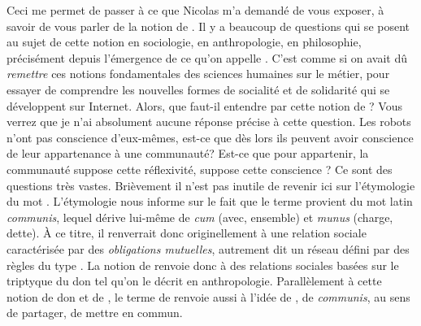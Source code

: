 {Ceci me permet de passer \`a ce que Nicolas m'a demand\'e de vous exposer, \`a savoir de vous parler de la notion de . Il y a beaucoup de questions qui se posent au sujet de cette notion en sociologie, en anthropologie, en philosophie, pr\'ecis\'ement depuis l'\'emergence de ce qu'on appelle . C'est comme si on avait d\^u {\em remettre} ces notions fondamentales des sciences humaines sur le m\'etier, pour essayer de comprendre les nouvelles formes de socialit\'e et de solidarit\'e qui se d\'eveloppent sur Internet. Alors, que faut{}-il entendre par cette notion de ? Vous verrez que je n'ai absolument aucune r\'eponse pr\'ecise \`a cette question. Les robots n'ont pas conscience d'eux{}-m\^emes, est{}-ce que d\`es lors ils peuvent avoir conscience de leur appartenance \`a une communaut\'e? Est{}-ce que pour appartenir, la communaut\'e suppose cette r\'eflexivit\'e, suppose cette conscience ? Ce sont des questions tr\`es vastes. Bri\`evement il n'est pas inutile de revenir ici sur l'\'etymologie du mot . L'\'etymologie nous informe sur le fait que le terme  provient du mot latin {\em communis}, lequel d\'erive lui{}-m\^eme de {\em cum} (avec, ensemble) et {\em munus} (charge, dette). \`A ce titre, il renverrait donc originellement \`a une relation sociale caract\'eris\'ee par des {\em obligations mutuelles}, autrement dit un r\'eseau d\'efini par des r\`egles du type . La notion de  renvoie donc \`a des relations sociales bas\'ees sur le triptyque du don tel qu'on le d\'ecrit en anthropologie. Parall\`element \`a cette notion de don et de , le terme de  renvoie aussi \`a l'id\'ee de , de {\em communis}, au sens de partager, de mettre en commun.

}
